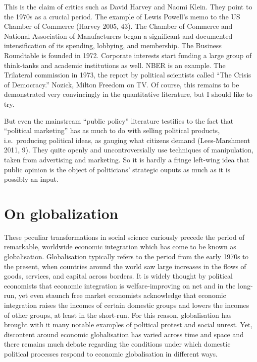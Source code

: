 \documentclass[12pt,book]{article}
\begin{document}
This is the claim of critics such as David Harvey and Naomi Klein. They
point to the 1970s as a crucial period. The example of Lewis Powell's
memo to the US Chamber of Commerce (Harvey 2005, 43). The Chamber of
Commerce and National Association of Manufacturers began a significant
and documented intensification of its spending, lobbying, and
membership. The Business Roundtable is founded in 1972. Corporate
interests start funding a large group of think-tanks and academic
institutions as well. NBER is an example. The Trilateral commission in
1973, the report by political scientists called ``The Crisis of
Democracy.'' Nozick, Milton Freedom on TV. Of course, this remains to be
demonstrated very convincingly in the quantitative literature, but I
should like to try.

But even the mainstream ``public policy'' literature testifies to the
fact that ``political marketing'' has as much to do with selling
political products, i.e.~producing political ideas, as gauging what
citizens demand (Lees-Marshment 2011, 9). They quite openly and
uncontroversially use techniques of manipulation, taken from advertising
and marketing. So it is hardly a fringe left-wing idea that public
opinion is the object of politicians' strategic ouputs as much as it is
possibly an input.

\section{On globalization}\label{on-globalization}

These peculiar transformations in social science curiously precede the
period of remarkable, worldwide economic integration which has come to
be known as globalisation. Globalisation typically refers to the period
from the early 1970s to the present, when countries around the world saw
large increases in the flows of goods, services, and capital across
borders. It is widely thought by political economists that economic
integration is welfare-improving on net and in the long-run, yet even
staunch free market economists acknowledge that economic integration
raises the incomes of certain domestic groups and lowers the incomes of
other groups, at least in the short-run. For this reason, globalisation
has brought with it many notable examples of political protest and
social unrest. Yet, discontent around economic globalisation has varied
across time and space and there remains much debate regarding the
conditions under which domestic political processes respond to economic
globalisation in different ways.
\end{document}
